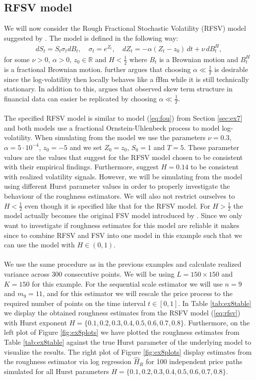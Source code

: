 \documentclass{article}
\begin{document}
\subsection{RFSV model} \label{sec:rfsv}
We will now consider the Rough Fractional Stochastic Volatility (RFSV) model suggested by \cite{gatheral}. The model is defined in the following way:
\begin{align}
dS_t = S_t \sigma_t dB_t, \quad \sigma_t = e^{Z_t}, \quad dZ_t = -\alpha (Z_t-z_0) \, dt + \nu \, dB^H_t, \label{eq:rfsv}
\end{align}
for some $\nu>0$, $\alpha>0$, $z_0\in\mathbb{R}$ and $H<\frac{1}{2}$ where $B_t$ is a Brownian motion and $B^H_t$ is a fractional Brownian motion. \cite{gatheral} further argues that choosing $\alpha \ll \frac{1}{T}$ is desirable since the log-volatility then locally behaves like a fBm while it is still technically stationary. In addition to this, \cite{gatheral} argues that observed skew term structure in financial data can easier be replicated by choosing $\alpha \ll \frac{1}{T}$.\\\\
The specified RFSV model is similar to model (\ref{eq:fou}) from Section \ref{sec:ex7} and both models use a fractional Ornstein-Uhlenbeck process to model log-volatility. When simulating from the model we use the parameters $\nu = 0.3$, $\alpha = 5\cdot 10^{-4}$, $z_0 = -5$ and we set $Z_0=z_0$, $S_0 = 1$ and $T=5$. These parameter values are the values that \cite{gatheral} suggest for the RFSV model chosen to be consistent with their empirical findings. Furthermore, \cite{gatheral} suggest $H=0.14$ to be consistent with realized volatility signals. However, we will be simulating from the model using different Hurst parameter values in order to properly investigate the behaviour of the roughness estimators. We will also not restrict ourselves to $H<\frac{1}{2}$ even though it is specified like that for the RFSV model. For $H>\frac{1}{2}$ the model actually becomes the original FSV model introduced by \cite{comte}. Since we only want to investigate if roughness estimates for this model are reliable it makes since to combine RFSV and FSV into one model in this example such that we can use the model with $H\in (0,1)$.\\\\
We use the same procedure as in the previous examples and calculate realized variance across 300 consecutive points. We will be using $L=150\times 150$ and $K=150$ for this example. For the sequential scale estimator we will use $n=9$ and $m_9=11$, and for this estimator we will rescale the price process to the required number of points on the time interval $t\in[0,1]$. In Table \ref{tab:ex8table} we display the obtained roughness estimates from the RSFV model (\ref{eq:rfsv}) with Hurst exponent $H= \{0.1,0.2,0.3,0.4,0.5,0.6,0.7,0.8\}$. Furthermore, on the left plot of Figure \ref{fig:ex8plots} we have plotted the roughness estimates from Table \ref{tab:ex8table} against the true Hurst parameter of the underlying model to visualize the results. The right plot of Figure \ref{fig:ex8plots} display estimates from the roughness estimator via log regression $\widehat{H}_R$ for 100 independent price paths simulated for all Hurst parameters $H= \{0.1,0.2,0.3,0.4,0.5,0.6,0.7,0.8\}$.
\end{document}
